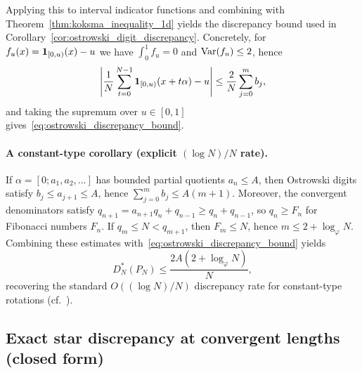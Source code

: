Applying this to interval indicator functions and combining with Theorem~\ref{thm:koksma_inequality_1d} yields the discrepancy bound used in Corollary~\ref{cor:ostrowski_digit_discrepancy}. Concretely, for $f_u(x)=\mathbf{1}_{[0,u)}(x)-u$ we have $\int_0^1 f_u=0$ and $\mathrm{Var}(f_u)\le 2$, hence
\begin{equation}
\left|\frac{1}{N}\sum_{t=0}^{N-1}\mathbf{1}_{[0,u)}(x+t\alpha)-u\right|
\le \frac{2}{N}\sum_{j=0}^m b_j,
\end{equation}
and taking the supremum over $u\in[0,1]$ gives~\eqref{eq:ostrowski_discrepancy_bound}.

\paragraph{A constant-type corollary (explicit \texorpdfstring{$(\log N)/N$}{(log N)/N} rate).}
If $\alpha=[0;a_1,a_2,\dots]$ has bounded partial quotients $a_n\le A$, then Ostrowski digits satisfy $b_j\le a_{j+1}\le A$, hence $\sum_{j=0}^{m} b_j\le A(m+1)$.
Moreover, the convergent denominators satisfy $q_{n+1}=a_{n+1}q_n+q_{n-1}\ge q_n+q_{n-1}$, so $q_n\ge F_n$ for Fibonacci numbers $F_n$. If $q_m\le N<q_{m+1}$, then $F_m\le N$, hence $m\le 2+\log_\varphi N$.
Combining these estimates with~\eqref{eq:ostrowski_discrepancy_bound} yields
\begin{equation}
D_N^\ast(P_N)\le \frac{2A(2+\log_\varphi N)}{N},
\end{equation}
recovering the standard $O((\log N)/N)$ discrepancy rate for constant-type rotations (cf.\ \cite{KuipersNiederreiter1974}).

\subsection{Exact star discrepancy at convergent lengths (closed form)}
\label{app:convergent_star_discrepancy}

